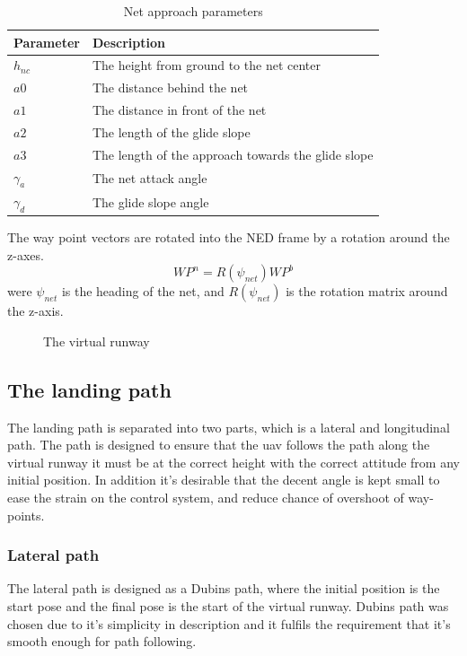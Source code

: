 \begin{table}[H]
\begin{center}
    \begin{tabular}{ | l | l |}
    \hline
    \textbf{Parameter} & \textbf{Description} \\ \hline
    $h_{nc}$ & The height from ground to the net center \\ \hline
    $a0$ & The distance behind the net \\ \hline
    $a1$ & The distance in front of the net \\ \hline
    $a2$ & The length of the glide slope \\ \hline
    $a3$ & The length of the approach towards the glide slope \\ \hline
    $\gamma_a$ & The net attack angle \\ \hline
    $\gamma_d$ & The glide slope angle \\ \hline
    \end{tabular}
\end{center}
\caption{Net approach parameters }
\label{Tb:Approach Parameters}
\end{table}
The way point vectors are rotated into the NED frame by a rotation around the z-axes.
\begin{equation}
WP^n = R(\psi_{net})WP^b
\end{equation}
were $\psi_{net}$ is the heading of the net, and $R(\psi_{net})$ is the rotation matrix around the z-axis.
\begin{figure}\label{Fig:LandingPhase}
\def\svgwidth{\textwidth} %

\caption{The virtual runway}
\end{figure}

\subsection{The landing path}\label{SS:LandingApproach}
The landing path is separated into two parts, which is a lateral and longitudinal path. The path is designed to ensure that the \gls{uav} follows the path along the virtual runway it must be at the correct height with the correct attitude from any initial position. In addition it's desirable that the decent angle is kept small to ease the strain on the control system, and reduce chance of overshoot of way-points.
\subsubsection{Lateral path}
The lateral path is designed as a Dubins path, where the initial position is the start pose and the final pose is the start of the virtual runway. Dubins path was chosen due to it's simplicity in description and it fulfils the requirement that it's smooth enough for path following.


